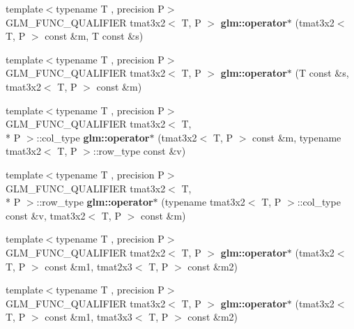 \begin{DoxyCompactItemize}
\item 
\hypertarget{namespaceglm_a9b2577e315bb7b464cc0e6ca13337bcb}{{\footnotesize template$<$typename T , precision P$>$ }\\G\-L\-M\-\_\-\-F\-U\-N\-C\-\_\-\-Q\-U\-A\-L\-I\-F\-I\-E\-R tmat3x2$<$ T, P $>$ {\bfseries glm\-::operator$\ast$} (tmat3x2$<$ T, P $>$ const \&m, T const \&s)}\label{namespaceglm_a9b2577e315bb7b464cc0e6ca13337bcb}

\item 
\hypertarget{namespaceglm_a772054b40ec7f37656fefb0b30cf3bea}{{\footnotesize template$<$typename T , precision P$>$ }\\G\-L\-M\-\_\-\-F\-U\-N\-C\-\_\-\-Q\-U\-A\-L\-I\-F\-I\-E\-R tmat3x2$<$ T, P $>$ {\bfseries glm\-::operator$\ast$} (T const \&s, tmat3x2$<$ T, P $>$ const \&m)}\label{namespaceglm_a772054b40ec7f37656fefb0b30cf3bea}

\item 
\hypertarget{namespaceglm_a130119d8e3a84e658a490564c3994e82}{{\footnotesize template$<$typename T , precision P$>$ }\\G\-L\-M\-\_\-\-F\-U\-N\-C\-\_\-\-Q\-U\-A\-L\-I\-F\-I\-E\-R tmat3x2$<$ T, \\*
P $>$\-::col\-\_\-type {\bfseries glm\-::operator$\ast$} (tmat3x2$<$ T, P $>$ const \&m, typename tmat3x2$<$ T, P $>$\-::row\-\_\-type const \&v)}\label{namespaceglm_a130119d8e3a84e658a490564c3994e82}

\item 
\hypertarget{namespaceglm_afb6b62d8d61e83273b7694a60341ba97}{{\footnotesize template$<$typename T , precision P$>$ }\\G\-L\-M\-\_\-\-F\-U\-N\-C\-\_\-\-Q\-U\-A\-L\-I\-F\-I\-E\-R tmat3x2$<$ T, \\*
P $>$\-::row\-\_\-type {\bfseries glm\-::operator$\ast$} (typename tmat3x2$<$ T, P $>$\-::col\-\_\-type const \&v, tmat3x2$<$ T, P $>$ const \&m)}\label{namespaceglm_afb6b62d8d61e83273b7694a60341ba97}

\item 
\hypertarget{namespaceglm_a41c5d9d01bb642d45a1e71fc27328470}{{\footnotesize template$<$typename T , precision P$>$ }\\G\-L\-M\-\_\-\-F\-U\-N\-C\-\_\-\-Q\-U\-A\-L\-I\-F\-I\-E\-R tmat2x2$<$ T, P $>$ {\bfseries glm\-::operator$\ast$} (tmat3x2$<$ T, P $>$ const \&m1, tmat2x3$<$ T, P $>$ const \&m2)}\label{namespaceglm_a41c5d9d01bb642d45a1e71fc27328470}

\item 
\hypertarget{namespaceglm_aee7ea900a08465c9c1817f53fcbcf7ff}{{\footnotesize template$<$typename T , precision P$>$ }\\G\-L\-M\-\_\-\-F\-U\-N\-C\-\_\-\-Q\-U\-A\-L\-I\-F\-I\-E\-R tmat3x2$<$ T, P $>$ {\bfseries glm\-::operator$\ast$} (tmat3x2$<$ T, P $>$ const \&m1, tmat3x3$<$ T, P $>$ const \&m2)}\label{namespaceglm_aee7ea900a08465c9c1817f53fcbcf7ff}


\end{DoxyCompactItemize}
